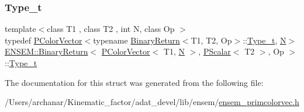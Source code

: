\subsubsection{\texorpdfstring{Type\_t}{Type\_t}\hspace{0.1cm}{\footnotesize\ttfamily [2/2]}}
{\footnotesize\ttfamily template$<$class T1 , class T2 , int N, class Op $>$ \\
typedef \mbox{\hyperlink{classENSEM_1_1PColorVector}{P\+Color\+Vector}}$<$typename \mbox{\hyperlink{structENSEM_1_1BinaryReturn}{Binary\+Return}}$<$T1, T2, Op$>$\+::\mbox{\hyperlink{structENSEM_1_1BinaryReturn_3_01PColorVector_3_01T1_00_01N_01_4_00_01PScalar_3_01T2_01_4_00_01Op_01_4_aa1c63622b6c827a70045ca780056506c}{Type\+\_\+t}}, \mbox{\hyperlink{operator__name__util_8cc_a7722c8ecbb62d99aee7ce68b1752f337}{N}}$>$ \mbox{\hyperlink{structENSEM_1_1BinaryReturn}{E\+N\+S\+E\+M\+::\+Binary\+Return}}$<$ \mbox{\hyperlink{classENSEM_1_1PColorVector}{P\+Color\+Vector}}$<$ T1, \mbox{\hyperlink{operator__name__util_8cc_a7722c8ecbb62d99aee7ce68b1752f337}{N}} $>$, \mbox{\hyperlink{classENSEM_1_1PScalar}{P\+Scalar}}$<$ T2 $>$, Op $>$\+::\mbox{\hyperlink{structENSEM_1_1BinaryReturn_3_01PColorVector_3_01T1_00_01N_01_4_00_01PScalar_3_01T2_01_4_00_01Op_01_4_aa1c63622b6c827a70045ca780056506c}{Type\+\_\+t}}}



The documentation for this struct was generated from the following file\+:\begin{DoxyCompactItemize}
\item 
/\+Users/archanar/\+Kinematic\+\_\+factor/adat\+\_\+devel/lib/ensem/\mbox{\hyperlink{lib_2ensem_2ensem__primcolorvec_8h}{ensem\+\_\+primcolorvec.\+h}}\end{DoxyCompactItemize}

